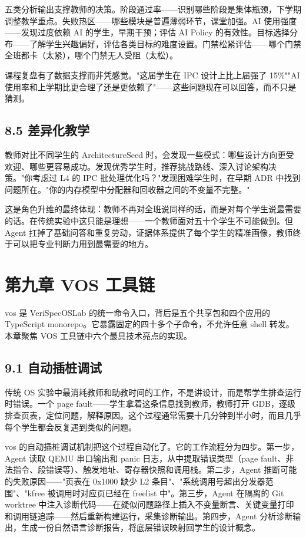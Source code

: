 \documentclass[UTF8,a4paper,12pt,openany]{ctexrep}
\begin{document}
五类分析输出支撑教师的决策。阶段通过率------识别哪些阶段是集体瓶颈，下学期调整教学重点。失败热区------哪些模块是普遍薄弱环节，课堂加强。AI 使用强度------发现过度依赖 AI 的学生，早期干预；评估 AI Policy 的有效性。目标选择分布------了解学生兴趣偏好，评估各类目标的难度设置。门禁松紧评估------哪个门禁全班都卡（太紧），哪个门禁无人受阻（太松）。

课程复盘有了数据支撑而非凭感觉。"这届学生在 IPC 设计上比上届强了 15\%""AI 使用率和上学期比更合理了还是更依赖了"------这些问题现在可以回答，而不只是猜测。

\section{8.5 差异化教学}\label{85-ux5deeux5f02ux5316ux6559ux5b66}

教师对比不同学生的 ArchitectureSeed 时，会发现一些模式：哪些设计方向更受欢迎、哪些更容易成功。发现优秀学生时，推荐挑战路线、深入讨论架构决策。"你考虑过 L4 的 IPC 批处理优化吗？"发现困难学生时，在早期 ADR 中找到问题所在。"你的内存模型中分配器和回收器之间的不变量不完整。"

这是角色升维的最终体现：教师不再对全班说同样的话，而是对每个学生说最需要的话。在传统实验中这只能是理想------一个教师面对五十个学生不可能做到。但 Agent 扛掉了基础问答和重复劳动，证据体系提供了每个学生的精准画像，教师终于可以把专业判断力用到最需要的地方。


\chapter{第九章 VOS 工具链}\label{ux7b2cux4e5dux7ae0-vos-ux5de5ux5177ux94fe}

vos 是 VeriSpecOSLab 的统一命令入口，背后是五个共享包和四个应用的 TypeScript monorepo。它暴露固定的四十多个子命令，不允许任意 shell 转发。本章聚焦 VOS 工具链中六个最具技术亮点的实现。

\section{9.1 自动插桩调试}\label{91-ux81eaux52a8ux63d2ux6869ux8c03ux8bd5}

传统 OS 实验中最消耗教师和助教时间的工作，不是讲设计，而是帮学生排查运行时错误。一个 page fault------学生拿着这条信息找到教师，教师打开 GDB，逐级排查页表，定位问题，解释原因。这个过程通常需要十几分钟到半小时，而且几乎每个学生都会反复遇到类似的问题。

vos 的自动插桩调试机制把这个过程自动化了。它的工作流程分为四步。第一步，Agent 读取 QEMU 串口输出和 panic 日志，从中提取错误类型（page fault、非法指令、段错误等）、触发地址、寄存器快照和调用栈。第二步，Agent 推断可能的失败原因------"页表在 0x1000 缺少 L2 条目"、"系统调用号超出分发器范围"、"kfree 被调用时对应页已经在 freelist 中"。第三步，Agent 在隔离的 Git worktree 中注入诊断代码------在疑似问题路径上插入不变量断言、关键变量打印和调用链追踪------然后重新构建运行，采集诊断输出。第四步，Agent 分析诊断输出，生成一份自然语言诊断报告，将底层错误映射回学生的设计概念。
\end{document}
